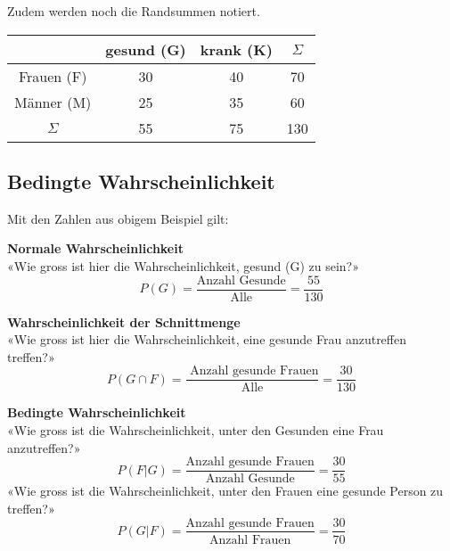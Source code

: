 \begin{multicols}{2}
Zudem werden noch die Randsummen notiert.


\begin{tabular}{c|c|c|c}
           & gesund (G)& krank (K)& $\Sigma$ \\\hline
Frauen (F) &        30 &       40 &       70 \\\hline
Männer (M) &        25 &       35 &       60 \\\hline
$\Sigma$   &        55 &       75 &      130 \\\hline
 \end{tabular}



\subsection*{Bedingte Wahrscheinlichkeit}


Mit den Zahlen aus obigem Beispiel gilt:

\textbf{Normale Wahrscheinlichkeit}\\
«Wie gross ist hier die Wahrscheinlichkeit, gesund (G) zu sein?»
$$P(G) = \frac{\textrm{Anzahl Gesunde}}{\textrm{Alle}} =  \frac{55}{130}$$

\textbf{Wahrscheinlichkeit der Schnittmenge}\\
«Wie gross ist hier die Wahrscheinlichkeit, eine gesunde Frau anzutreffen treffen?»
$$P(G\cap F) = \frac{\textrm{\ Anzahl gesunde Frauen}}{\textrm{Alle}}= \frac{30}{130}$$

\textbf{Bedingte Wahrscheinlichkeit}\\
«Wie gross ist die Wahrscheinlichkeit, unter den Gesunden eine Frau anzutreffen?»
$$P(F | G) = \frac{\textrm{Anzahl gesunde Frauen}}{\textrm{Anzahl Gesunde}} =  \frac{30}{55}$$
«Wie gross ist die Wahrscheinlichkeit, unter den Frauen eine gesunde Person zu treffen?»
$$P(G | F) = \frac{\textrm{Anzahl gesunde Frauen}}{\textrm{Anzahl Frauen}}=  \frac{30}{70}$$

\end{multicols}


\newpage
\keinHeaderUndKeinFooter{}

